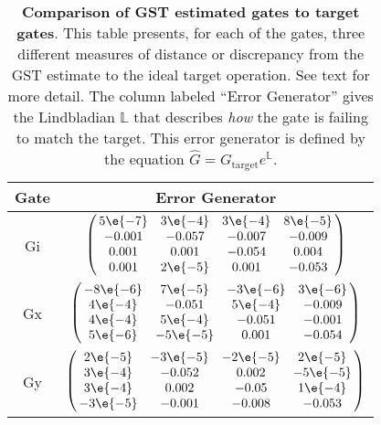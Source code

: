 {\begin{table}[h]
\begin{center}
\vspace{2em}
\begin{tabular}[l]{|c|c|}
\hline
Gate & Error Generator \\ \hline
Gi & $ \left(\!\!\begin{array}{cccc}
5\e{-7} & 3\e{-4} & 3\e{-4} & 8\e{-5} \\ 
-0.001 & -0.057 & -0.007 & -0.009 \\ 
0.001 & 0.001 & -0.054 & 0.004 \\ 
0.001 & 2\e{-5} & 0.001 & -0.053
 \end{array}\!\!\right) $
 \\ \hline
Gx & $ \left(\!\!\begin{array}{cccc}
-8\e{-6} & 7\e{-5} & -3\e{-6} & 3\e{-6} \\ 
4\e{-4} & -0.051 & 5\e{-4} & -0.009 \\ 
4\e{-4} & 5\e{-4} & -0.051 & -0.001 \\ 
5\e{-6} & -5\e{-5} & 0.001 & -0.054
 \end{array}\!\!\right) $
 \\ \hline
Gy & $ \left(\!\!\begin{array}{cccc}
2\e{-5} & -3\e{-5} & -2\e{-5} & 2\e{-5} \\ 
3\e{-4} & -0.052 & 0.002 & -5\e{-5} \\ 
3\e{-4} & 0.002 & -0.05 & 1\e{-4} \\ 
-3\e{-5} & -0.001 & -0.008 & -0.053
 \end{array}\!\!\right) $
 \\ \hline
\end{tabular}

\caption{\textbf{Comparison of GST estimated gates to target gates}.  This table presents, for each of the gates, three different measures of distance or discrepancy from the GST estimate to the ideal target operation.  See text for more detail.  The column labeled ``Error Generator'' gives the Lindbladian $\mathbb{L}$ that describes \emph{how} the gate is failing to match the target.  This error generator is defined by the equation $\hat{G} = G_{\mathrm{target}}e^{\mathbb{L}}$. \label{bestCPTPGatesetVsTargetTable}}
\end{center}
\end{table}

}
